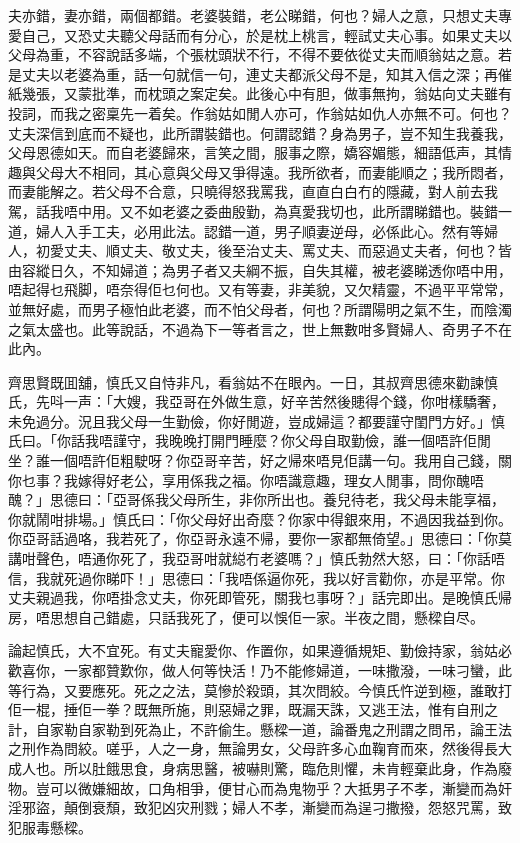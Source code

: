 \documentclass[a5paper, 12pt, openany]{book} %
\begin{document}
	夫亦錯，妻亦錯，兩個都錯。老婆裝錯，老公睇錯，何也？婦人之意，只想丈夫專愛自己，又恐丈夫聽父母話而有分心，於是枕上桃言，輕試丈夫心事。如果丈夫以父母為重，不容說話多端，个張枕頭狀不行，不得不要依從丈夫而順翁姑之意。若是丈夫以老婆為重，話一句就信一句，連丈夫都派父母不是，知其入信之深；再催紙幾張，又蒙批準，而枕頭之案定矣。此後心中有胆，做事無拘，翁姑向丈夫雖有投詞，而我之密稟先一着矣。作翁姑如閒人亦可，作翁姑如仇人亦無不可。何也？丈夫深信到底而不疑也，此所謂裝錯也。何謂認錯？身為男子，豈不知生我養我，父母恩德如天。而自老婆歸來，言笑之間，服事之際，嬌容媚態，細語低声，其情趣與父母大不相同，其心意與父母又爭得遠。我所欲者，而妻能順之；我所悶者，而妻能解之。若父母不合意，只曉得怒我罵我，直直白白冇的隱藏，對人前去我駕，話我唔中用。又不如老婆之委曲殷勤，為真愛我切也，此所謂睇錯也。裝錯一道，婦人入手工夫，必用此法。認錯一道，男子順妻逆母，必係此心。然有等婦人，初愛丈夫、順丈夫、敬丈夫，後至治丈夫、罵丈夫、而惡過丈夫者，何也？皆由容縱日久，不知婦道；為男子者又夫綱不振，自失其權，被老婆睇透你唔中用，唔起得乜飛脚，唔奈得佢乜何也。又有等妻，非美貌，又欠精靈，不過平平常常，並無好處，而男子極怕此老婆，而不怕父母者，何也？所謂陽明之氣不生，而陰濁之氣太盛也。此等說話，不過為下一等者言之，世上無數咁多賢婦人、奇男子不在此內。

	齊思賢既囬舖，慎氏又自恃非凡，看翁姑不在眼內。一日，其叔齊思德來勸諫慎氏，先呌一声：「大嫂，我亞哥在外做生意，好辛苦然後贃得个錢，你咁樣驕奢，未免過分。況且我父母一生勤儉，你好閒遊，豈成婦這？都要謹守閨門方好。」慎氏曰。「你話我唔謹守，我晚晚打開門睡麼？你父母自取勤儉，誰一個唔許佢閒坐？誰一個唔許佢粗駛呀？你亞哥辛苦，好之帰來唔見佢講一句。我用自己錢，關你乜事？我嫁得好老公，享用係我之福。你唔識意趣，理女人閒事，問你醜唔醜？」思德曰：「亞哥係我父母所生，非你所出也。養兒待老，我父母未能享福，你就鬧咁排場。」慎氏曰：「你父母好出奇麼？你家中得銀來用，不過因我益到你。你亞哥話過咯，我若死了，你亞哥永遠不帰，要你一家都無倚望。」思德曰：「你莫講咁聲色，唔通你死了，我亞哥咁就縂冇老婆嗎？」慎氏勃然大怒，曰：「你話唔信，我就死過你睇吓！」思德曰：「我唔係逼你死，我以好言勸你，亦是平常。你丈夫親過我，你唔掛念丈夫，你死即管死，關我乜事呀？」話完即出。是晚慎氏帰房，唔思想自己錯處，只話我死了，便可以悞佢一家。半夜之間，懸樑自尽。

	論起慎氏，大不宜死。有丈夫寵愛你、作置你，如果遵循規矩、勤儉持家，翁姑必歡喜你，一家都贊歎你，做人何等快活！乃不能修婦道，一味撒潑，一味刁蠻，此等行為，又要應死。死之之法，莫慘於殺頭，其次問絞。今慎氏忤逆到極，誰敢打佢一棍，捶佢一拳？既無所施，則惡婦之罪，既漏天誅，又逃王法，惟有自刑之計，自家勒自家勒到死為止，不許偷生。懸樑一道，論番鬼之刑謂之問吊，論王法之刑作為問絞。嗟乎，人之一身，無論男女，父母許多心血鞠育而來，然後得長大成人也。所以肚餓思食，身病思醫，被嚇則驚，臨危則懼，未肯輕棄此身，作為廢物。豈可以微嫌細故，口角相爭，便甘心而為鬼物乎？大抵男子不孝，漸變而為奸淫邪盜，顛倒衰頹，致犯凶灾刑戮；婦人不孝，漸變而為逞刁撒撥，怨怒咒罵，致犯服毒懸樑。
\end{document}

